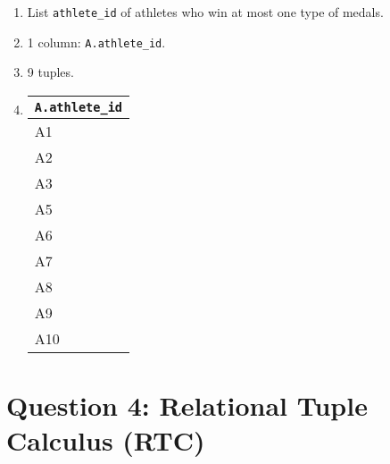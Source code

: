 \documentclass{article}
\begin{document}
\begin{enumerate}
    \begin{enumerate}
        \item List \texttt{athlete\_id} of athletes who win at most one type of medals.
        \item 1 column: \texttt{A.athlete\_id}.
        \item 9 tuples.
        \item 
        \begin{tabular}{@{}l@{}}
            \toprule
            \texttt{A.athlete\_id} \\ \midrule
            A1          \\
            A2          \\
            A3          \\
            A5          \\
            A6          \\
            A7          \\
            A8          \\
            A9          \\
            A10         \\ \bottomrule
        \end{tabular}
    \end{enumerate}
\end{enumerate}
\newpage

\section*{Question 4: Relational Tuple Calculus (RTC)}
\end{document}
